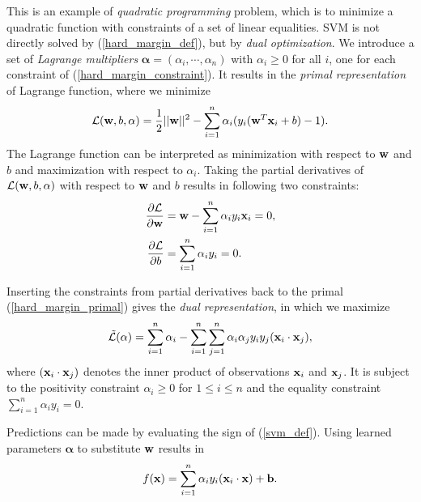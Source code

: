 \documentclass[english]{tktltiki}
\newcommand{\Lcal}{\mathcal{L}}
\newcommand{\xb}{{\bf x}}
\newcommand{\wb}{{\bf w}}
\newcommand{\bb}{{\bf b}}
\newcommand{\valpha}{\mathbf{\alpha}}
\begin{document}

This is an example of {\em quadratic programming} problem, which is to minimize a quadratic function with constraints of a set of linear equalities. SVM is not directly solved by (\ref{hard_margin_def}), but by {\em dual optimization}. We introduce a set of {\em Lagrange multipliers} $\valpha = (\alpha_i,\cdots,\alpha_n)$ with $\alpha_i \ge 0$ for all $i$, one for each constraint of (\ref{hard_margin_constraint}). It results in the {\em primal representation} of Lagrange function, where we minimize
\begin{align}
\Lcal(\wb, b, \valpha) = \frac{1}{2}||\wb||^2 - \sum_{i = 1}^n{\alpha_i(y_i(\wb^T \xb_i + b)-1)}.
\label{hard_margin_primal}
\end{align}
The Lagrange function can be interpreted as minimization with respect to $\wb$ and $b$ and maximization with respect to $\alpha_i$. Taking the partial derivatives of $\Lcal(\wb, b, \valpha)$ with respect to $\wb$ and $b$ results in following two constraints:
\begin{align*}
\frac{\partial \Lcal}{\partial \wb} &=  \wb - \sum_{i = 1}^{n}{\alpha_i y_i \xb_i} = 0, \\
\frac{\partial \Lcal}{\partial b} &=  \sum_{i = 1}^{n}{\alpha_i y_i} = 0.
\end{align*}


Inserting the constraints from partial derivatives back to the primal (\ref{hard_margin_primal}) gives the {\em dual representation}, in which we maximize
\begin{align}
\tilde{\Lcal}(\valpha) = \sum_{i=1}^{n}{\alpha_i} - \sum_{i = 1}^{n}\sum_{j = 1}^{n}{\alpha_i \alpha_j y_i y_j (\xb_i \cdot \xb_j)},
\label{hard_margin_dual}
\end{align}
where $(\xb_i\cdot \xb_j)$ denotes the inner product of observations $\xb_i$ and $\xb_j$. It is subject to the positivity constraint $\alpha_i \ge 0$ for $1 \leq i \leq n$ and the equality constraint $\sum_{i=1}^{n}{\alpha_i y_i} = 0$.


Predictions can be made by evaluating the sign of (\ref{svm_def}). Using learned parameters $\valpha$ to substitute $\wb$ results in
\begin{align}
f(\xb) = \sum_{i = 1}^{n}{\alpha_i y_i (\xb_i \cdot \xb)} + \bb.
\label{hard_margin_decision}
\end{align}

\end{document}
